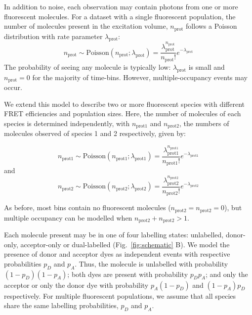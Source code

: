 In addition to noise, each observation may contain photons from one or more fluorescent molecules. For a dataset with a single fluorescent population, the number of molecules present in the excitation volume, $n_{\text{prot}}$ follows a Poisson distribution with rate parameter $\lambda_{\text{prot}}$:
\begin{equation}
n_{\text{prot}} \sim \text{Poisson}(n_{\text{prot}}; \lambda_{\text{prot}}) = \frac{\lambda_{\text{prot}}^{n_{\text{prot}}}}{n_{\text{prot}}!}e^{-\lambda_{\text{prot}}}
\label{eq:nprot}
\end{equation}
The probability of seeing any molecule is typically low: $\lambda_{\text{prot}}$ is small and $n_{\text{prot}} = 0$ for the majority of time-bins. However, multiple-occupancy events may occur.

We extend this model to describe two or more fluorescent species with different FRET efficiencies and population sizes. Here, the number of molecules of each species is determined independently, with $n_{\text{prot1}}$ and $n_{\text{prot2}}$, the numbers of molecules observed of species 1 and 2 respectively, given by:

\begin{equation}
n_{\text{prot1}} \sim \text{Poisson}(n_{\text{prot1}}; \lambda_{\text{prot1}}) = \frac{\lambda_{\text{prot1}}^{n_{\text{prot1}}}}{n_{\text{prot1}}!}e^{-\lambda_{\text{prot1}}}
\end{equation}
and
\begin{equation}
n_{\text{prot2}} \sim \text{Poisson}(n_{\text{prot2}}; \lambda_{\text{prot2}}) = \frac{\lambda_{\text{prot2}}^{n_{\text{prot2}}}}{n_{\text{prot2}}!}e^{-\lambda_{\text{prot2}}}
\end{equation}

As before, most bins contain no fluorescent molecules ($n_{\text{prot2}} = n_{\text{prot2}} = 0$), but multiple occupancy can be modelled when $n_{\text{prot2}} + n_{\text{prot2}} >1$.

Each molecule present may be in one of four labelling states: unlabelled, donor-only, acceptor-only or dual-labelled (Fig.~\ref{fig:schematic} B). We model the presence of donor and acceptor dyes as independent events with respective probabilities $p_D$ and $p_A$. Thus, the molecule is unlabelled with probability $(1-p_D)(1-p_A)$; both dyes are present with probability $p_D p_A$; and only the acceptor or only the donor dye with probability $p_A (1-p_D)$ and $(1-p_A)p_D$ respectively. For multiple fluorescent populations, we assume that all species share the same labelling probabilities, $p_D$ and $p_A$. 

